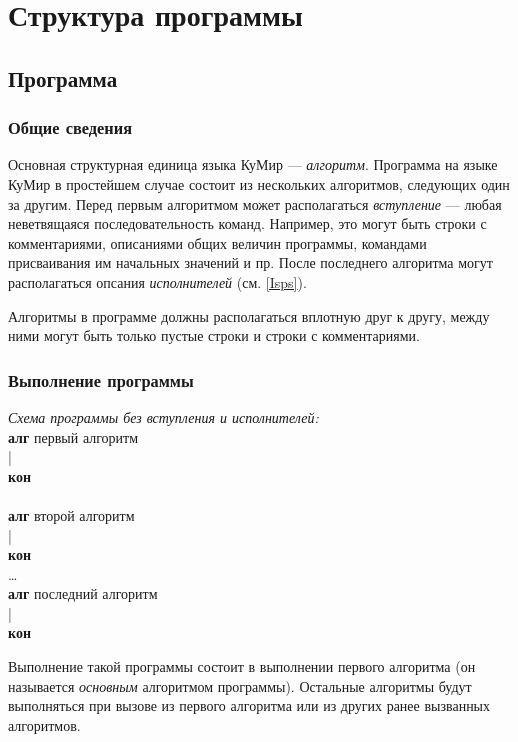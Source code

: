 \documentclass[12pt,a4paper]{article}
\begin{document}

\section{Структура программы}

\subsection{Программа}

\subsubsection{Общие сведения}
	Основная структурная единица языка КуМир --- \emph{алгоритм}. Программа на языке КуМир в простейшем случае состоит из нескольких алгоритмов, следующих один за другим. Перед первым алгоритмом может располагаться \emph{вступление} --- любая неветвящаяся последовательность команд. Например, это могут быть строки с комментариями, описаниями общих величин программы, командами присваивания им начальных значений и пр. После последнего алгоритма могут располагаться опсания \emph{исполнителей} (см. \ref{Isps}).
	
Алгоритмы в программе должны располагаться вплотную друг к другу, между ними могут быть только пустые строки и строки с комментариями.

\subsubsection{Выполнение программы}

\emph{Схема программы без вступления и исполнителей:}
{\sffamily\\
\textbf{алг} первый алгоритм\\
|\\
\textbf{кон}\\
~\\
\textbf{алг} второй алгоритм\\
|\\
\textbf{кон}\\
\dots\\
\textbf{алг} последний алгоритм\\
|\\
\textbf{кон}
}

Выполнение такой программы состоит в выполнении первого алгоритма (он называется \emph{основным} алгоритмом программы). Остальные алгоритмы будут выполняться при вызове из первого алгоритма или из других ранее вызванных алгоритмов.
\end{document}

